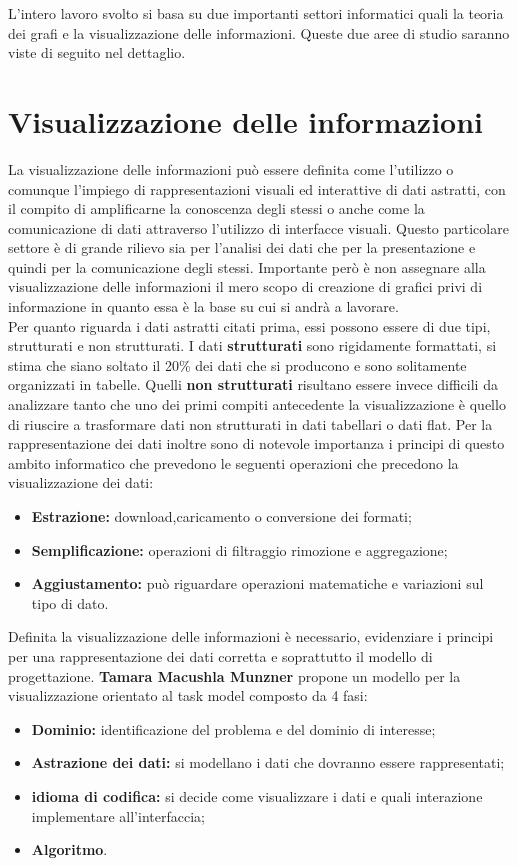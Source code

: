 \large{
L'intero lavoro svolto si basa su due importanti settori informatici quali la teoria dei grafi e la visualizzazione delle informazioni. Queste due aree di studio saranno viste di seguito nel dettaglio.
\section{Visualizzazione delle informazioni}
La visualizzazione delle informazioni può essere definita come l'utilizzo o comunque l'impiego di rappresentazioni visuali ed interattive di dati astratti, con il compito di amplificarne la conoscenza degli stessi o anche come la comunicazione di dati attraverso l'utilizzo di interfacce visuali. Questo particolare settore è di grande rilievo sia per l'analisi dei dati che per la presentazione e quindi per la comunicazione degli stessi. Importante però è non assegnare alla visualizzazione delle informazioni il mero scopo di creazione di grafici privi di informazione in quanto essa è la base su cui si andrà a lavorare. \\
Per quanto riguarda i dati astratti citati prima, essi possono essere di due tipi, strutturati e non strutturati. I dati \textbf{strutturati} sono rigidamente formattati, si stima che siano soltato il 20\% dei dati che si producono e sono solitamente organizzati in tabelle. Quelli \textbf{non strutturati} risultano essere invece difficili da analizzare tanto che uno dei primi compiti antecedente la visualizzazione è quello di riuscire a trasformare dati non strutturati in dati tabellari o dati flat.
Per la rappresentazione dei dati inoltre sono di notevole importanza i principi di questo ambito informatico che prevedono le seguenti operazioni che precedono la visualizzazione dei dati:
\begin{itemize}
	\item\textbf{Estrazione:} download,caricamento o conversione dei formati;
	\item\textbf{Semplificazione:} operazioni di filtraggio rimozione e aggregazione;
	\item\textbf{Aggiustamento: } può riguardare operazioni matematiche e variazioni sul tipo di dato.
\end{itemize}
Definita la visualizzazione delle informazioni è necessario, evidenziare i principi per una rappresentazione dei dati corretta e soprattutto il modello di progettazione.
\textbf{Tamara Macushla Munzner} propone un modello per la visualizzazione orientato al task model composto da 4 fasi:
\begin{itemize}
	\item \textbf{Dominio:} identificazione del problema e del dominio di interesse;
	\item \textbf{Astrazione dei dati:} si modellano i dati che dovranno essere rappresentati;
	\item \textbf{idioma di codifica:} si decide come visualizzare i dati e quali interazione implementare all'interfaccia;
	\item \textbf{Algoritmo}.
\end{itemize}

}
